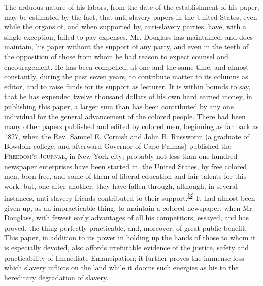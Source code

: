 The arduous nature of his labors, from the date of the establishment of
his paper, may be estimated by the fact, that anti-slavery papers in the
United States, even while the organs of, and when supported by,
anti-slavery parties, have, with a single exception, failed to pay
expenses. Mr. Douglass has maintained, and does maintain, his paper
without the support of any party, and even in the teeth of the
opposition of those from whom he had reason to expect counsel and
encouragement. He has been compelled, at one and the same time, and
almost constantly, during the past seven years, to contribute matter to
its columns as editor, and to raise funds for its support as lecturer.
It is within bounds to say, that he has expended twelve thousand dollars
of his own hard earned money, in publishing this paper, a larger sum
than has been contributed by any one individual for the general
advancement of the colored people. There had been many other papers
published and edited by colored men, beginning as far back as 1827, when
the Rev. Samuel E. Cornish and John B. Russworm (a graduate of Bowdoin
college, and afterward Governor of Cape Palmas) published the
\textsc{Freedom's Journal}, in New York city; probably not less than one
hundred newspaper enterprises have been started in. the United States,
by free colored men, born free, and some of them of liberal education
and fair talents for this work; but, one after another, they have fallen
through, although, in several instances, anti-slavery
{\protect\hypertarget{xxv}{}{}}friends contributed to their
support.\textsuperscript{\protect\hyperlink{cite_note-3}{{[}3{]}}} It
had almost been given up, as an impracticable thing, to maintain a
colored newspaper, when Mr. Douglass, with fewest early advantages of
all his competitors, essayed, and has proved, the thing perfectly
practicable, and, moreover, of great public benefit. This paper, in
addition to its power in holding up the hands of those to whom it is
especially devoted, also affords irrefutable evidence of the justice,
safety and practicability of Immediate Emancipation; it further proves
the immense loss which slavery inflicts on the land while it dooms such
energies as his to the hereditary degradation of slavery.

